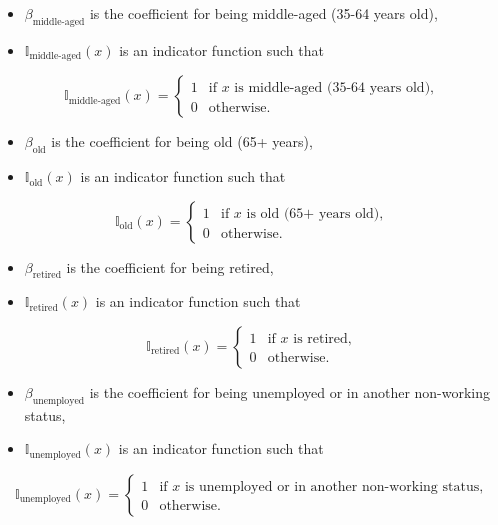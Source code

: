 \documentclass[
  letterpaper,
  DIV=11,
  numbers=noendperiod]{scrartcl}
\begin{document}
\begin{itemize}
\item
  \(\beta_\text{middle-aged}\) is the coefficient for being middle-aged
  (35-64 years old),
\item
  \(\mathbb{I}_{\text{middle-aged}}(x)\) is an indicator function such
  that
\end{itemize}

\[
    \mathbb{I}_{\mbox{middle-aged}}(x) =
    \begin{cases}
    1 & \mbox{if } x \mbox{ is middle-aged (35-64 years old)}, \\
    0 & \mbox{otherwise}.
    \end{cases}
\]

\begin{itemize}
\item
  \(\beta_\text{old}\) is the coefficient for being old (65+ years),
\item
  \(\mathbb{I}_{\text{old}}(x)\) is an indicator function such that
\end{itemize}

\[
    \mathbb{I}_{\mbox{old}}(x) =
    \begin{cases}
    1 & \mbox{if } x \mbox{ is old (65+ years old)}, \\
    0 & \mbox{otherwise}.
    \end{cases}
\]

\begin{itemize}
\item
  \(\beta_\text{retired}\) is the coefficient for being retired,
\item
  \(\mathbb{I}_{\text{retired}}(x)\) is an indicator function such that
\end{itemize}

\[
    \mathbb{I}_{\mbox{retired}}(x) =
    \begin{cases}
    1 & \mbox{if } x \mbox{ is retired}, \\
    0 & \mbox{otherwise}.
    \end{cases}
\]

\begin{itemize}
\item
  \(\beta_\text{unemployed}\) is the coefficient for being unemployed or
  in another non-working status,
\item
  \(\mathbb{I}_{\text{unemployed}}(x)\) is an indicator function such
  that
\end{itemize}

\[
    \mathbb{I}_{\mbox{unemployed}}(x) =
    \begin{cases}
    1 & \mbox{if } x \mbox{ is unemployed or in another non-working status}, \\
    0 & \mbox{otherwise}.
    \end{cases}
\]
\end{document}

